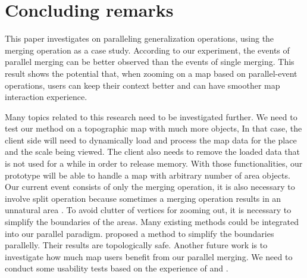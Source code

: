 \documentclass{ica}
\begin{document}
\section{Concluding remarks}
\label{sec:concluding_remarks}

This paper investigates on paralleling generalization operations,
using the merging operation as a case study. 
According to our experiment,
the events of parallel merging 
can be better observed than the events of single merging.
This result shows the potential that,
when zooming on a map based on parallel-event operations,
users can keep their context better 
and can have smoother map interaction experience.

Many topics related to this research need to be investigated further.
We need to test our method on a topographic map with much more objects,
In that case, the client side will need to dynamically load 
and process the map data 
for the place and the scale being viewed.
The client also needs to remove the loaded data that is not used for a while 
in order to release memory.
With those functionalities, our prototype will be able to handle 
a map with arbitrary number of area objects.
Our current event consists of only the merging operation,
it is also necessary to involve split operation
because sometimes a merging operation results in an unnatural area
\citep{Haunert2008Skeleton,Meijers2016Split}.
To avoid clutter of vertices for zooming out, 
it is necessary to simplify the boundaries of the areas.
Many existing methods could be integrated into our parallel paradigm.
\citet{Meijers2011LineSimp} proposed a method 
to simplify the boundaries parallelly. 
Their results are topologically safe. 
Another future work is to investigate 
how much map users benefit from our parallel merging.
We need to conduct some usability tests based on the experience of
\citet[]{Suba2017Thesis} and \citet{Midtbo2007}.
\end{document}
